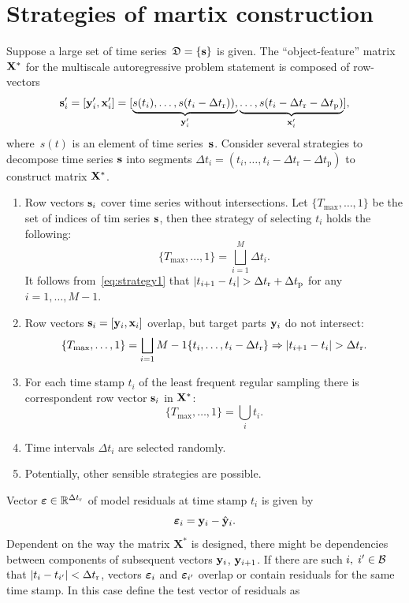 \documentclass[12pt]{article}
\begin{document}
\section{Strategies of martix construction}
Suppose a large set of time series~${\mathfrak{D}}=\{{\mathbf{s}}\}$ is given. The ``object-feature'' matrix~${\mathbf{X}}^*$ for the multiscale autoregressive problem statement is composed of row-vectors
\[
{\mathbf{s}}_i^\prime = [{\mathbf{y}}_i^\prime, {\mathbf{x}}_i^\prime] = [\underbrace{s(t_i),\dots,s(t_i-\Delta t_\text{r})),}_{{\mathbf{y}}_i^\prime}
\underbrace{\dots,s(t_i-\Delta t_\text{r}-\Delta t_\text{p})}_{{\mathbf{x}}_i^\prime}],
\]
where~$s(t)$ is an element of time series~${\mathbf{s}}$. Consider several strategies to decompose time series ${\mathbf{s}}$ into segments $\Delta t_i = (t_i,\dots,t_i-\Delta t_\text{r}-\Delta t_\text{p})$ to construct  matrix ${\mathbf{X}}^{*}$.
\begin{enumerate}
\item Row vectors ${\mathbf{s}}_i$ cover time series without intersections. Let $\{T_{\max}, \dots, 1\}$ be the set of indices of tim series ${\mathbf{s}}$, then thee strategy of selecting $t_i$ holds the following:
\begin{equation}\label{eq:strategy1}\{T_{\max}, \dots, 1\} = \bigsqcup_{i=1}^{M} \Delta t_i.\end{equation}
It follows from~\eqref{eq:strategy1} that $|t_{i+1} - t_i| > \Delta t_\text{r} + \Delta t_\text{p}$ for any $i = 1, \dots, M-1$.
\item Row vectors ${\mathbf{s}}_i = [{\mathbf{y}}_i, {\mathbf{x}}_i]$ overlap, but target parts  ${\mathbf{y}}_i$ do not intersect:
    \begin{equation}\label{eq:strategy2}\{T_{\max}, \dots, 1\} = \bigsqcup_{i=1}{M-1} \{t_i,\dots,t_i-\Delta t_\text{r}\} \Rightarrow |t_{i+1} - t_i| > \Delta t_\text{r}. \end{equation}
\item For each time stamp $t_i$ of the least frequent regular sampling there is correspondent row vector ${\mathbf{s}}_i$ in ${\mathbf{X}}^{*}$:
    \[\{T_{\max}, \dots, 1\} = \bigcup_i t_i. \]
\item Time intervals $\Delta t_i$ are selected randomly.
\item Potentially, other sensible strategies are possible.
\end{enumerate}
 Vector ${\boldsymbol{\varepsilon}} \in \mathbb{R}^{\Delta t_\text{r}}$ of model residuals at time stamp $t_i$ is given by
\[{\boldsymbol{\varepsilon}}_i = {{\mathbf{y}}}_i - \hat{{\mathbf{y}}}_i.\]
Dependent on the way the matrix $\mathbf{X}^{*}$ is designed, there might be dependencies between components of subsequent vectors ${\mathbf{y}}_{i}$, ${\mathbf{y}}_{i+1}$.
If there are such $i, \; i' \in {\mathcal{B}}$ that $|t_i - t_{i'}| < \Delta t_\text{r}$, vectors ${\boldsymbol{\varepsilon}}_i$ and ${\boldsymbol{\varepsilon}}_{i'}$ overlap or contain residuals for the same time stamp. In this case define the test vector of residuals as
\end{document}
